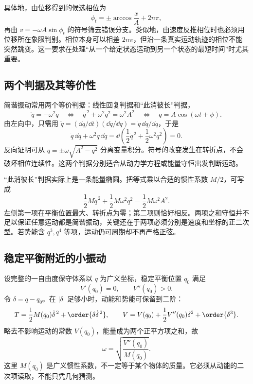 具体地，由位移得到的候选相位为
\[
 \phi_t=\pm\arccos\frac{x}{A}+2n\pi,
\]
再由 $v=-\omega A\sin\phi_t$ 的符号筛去错误分支。类似地，由速度反推相位时也必须用位移所在象限判别。相位本身可以相差 $2n\pi$，但沿一条真实运动轨迹的相位不能突然跳变。这一要求在处理“从一个给定状态运动到另一个状态的最短时间”时尤其重要。

\subsection{两个判据及其等价性}

简谐振动常用两个等价判据：线性回复判据和“此消彼长”判据，
\begin{equation}
 \ddot q=-\omega^2q
 \quad\Longleftrightarrow\quad
 \dot q^{\,2}+\omega^2q^2=\omega^2A^2
 \quad\Longleftrightarrow\quad
 q=A\cos(\omega t+\phi).
 \label{r2ch04:eq:006}
\end{equation}
由左向中，只需用 $\ddot q=(\dd q/\dd t)(\dd\dot q/\dd q)=\dot q\,\dd\dot q/\dd q$，于是
\[
 \dot q\,\dd\dot q+\omega^2q\,\dd q
 =\dd\!\left(\frac12\dot q^{\,2}+\frac12\omega^2q^2\right)=0.
\]
反向证明可从 $\dot q=\pm\omega\sqrt{A^2-q^2}$ 分离变量积分。符号的改变发生在转折点，不会破坏相位连续性。这两个判据分别适合从动力学方程或能量守恒出发判断运动。

“此消彼长”判据实际上是一条能量椭圆。把等式乘以合适的惯性系数 $M/2$，可写成
\[
 \frac12M\dot q^{\,2}+\frac12M\omega^2q^2
 =\frac12M\omega^2A^2.
\]
左侧第一项在平衡位置最大、转折点为零；第二项则恰好相反。两项之和守恒并不足以保证任意运动都是简谐振动，关键还在于两项必须分别是速度和坐标的正二次型。若势能含 $q^3,q^4$ 等项，运动仍可周期却不再严格正弦。

\subsection{稳定平衡附近的小振动}

设完整的一自由度保守体系以 $q$ 为广义坐标，稳定平衡位置 $q_0$ 满足
\[
 V'(q_0)=0,\qquad V''(q_0)>0.
\]
令 $\delta=q-q_0$。在 $|\delta|$ 足够小时，动能和势能可保留到二阶：
\begin{equation}
 T=\frac12M(q_0)\dot\delta^{\,2}+\order{\delta\dot\delta^{\,2}},
 \qquad
 V=V(q_0)+\frac12V''(q_0)\delta^2+\order{\delta^3}.
 \label{r2ch04:eq:007}
\end{equation}
略去不影响运动的常数 $V(q_0)$，能量成为两个正平方项之和，故
\begin{equation}
 \omega=\sqrt{\frac{V''(q_0)}{M(q_0)}}.
 \label{r2ch04:eq:008}
\end{equation}
这里 $M(q_0)$ 是广义惯性系数，不一定等于某个物体的质量。它必须从动能的二次项读取，不能只凭几何猜测。

